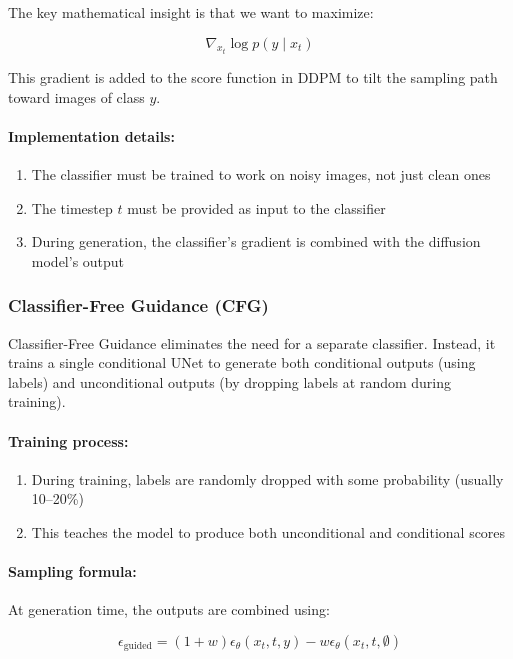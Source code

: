The key mathematical insight is that we want to maximize:

\[
\nabla_{x_t} \log p(y \mid x_t)
\]

This gradient is added to the score function in DDPM to tilt the sampling path toward images of class $y$.

\paragraph{Implementation details:}
\begin{enumerate}
    \item The classifier must be trained to work on noisy images, not just clean ones
    \item The timestep $t$ must be provided as input to the classifier
    \item During generation, the classifier's gradient is combined with the diffusion model's output
\end{enumerate}

\subsubsection*{Classifier-Free Guidance (CFG)}

Classifier-Free Guidance eliminates the need for a separate classifier. Instead, it trains a single conditional UNet to generate both conditional outputs (using labels) and unconditional outputs (by dropping labels at random during training).

\paragraph{Training process:}
\begin{enumerate}
    \item During training, labels are randomly dropped with some probability (usually 10--20\%)
    \item This teaches the model to produce both unconditional and conditional scores
\end{enumerate}

\paragraph{Sampling formula:} At generation time, the outputs are combined using:

\[
\epsilon_{\text{guided}} = (1 + w)\epsilon_\theta(x_t, t, y) - w\epsilon_\theta(x_t, t, \emptyset)
\]

